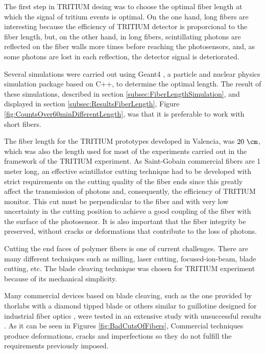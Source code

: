 The first step in TRITIUM desing was to choose the optimal fiber length at which the signal of tritium events is optimal. On the one hand, long fibers are interesting because the efficiency of TRITIUM detector is proporcional to the fiber length, but, on the other hand, in long fibers, scintillating photons are reflected on the fiber walls more times before reaching the photosensors, and, as some photons are lost in each reflection, the detector signal is deteriorated.

Several simulations were carried out using Geant4 \cite{Geant4WebPage}, a particle and nuclear physics simulation package based on C++, to determine the optimal length. The result of these simulations, described in section \ref{subsec:FiberLengthSimulation}, and displayed in section \ref{subsec:ResultsFiberLength}, Figure \ref{fig:CountsOver60minDifferentLength}, was that it is preferable to work with short fibers.

The fiber length for the TRITIUM prototypes developed in Valencia, was $20~\cm$, which was also the length used for most of the experiments carried out in the framework of the TRITIUM experiment. As Saint-Gobain commercial fibers are 1 meter long, an effective scintillator cutting technique had to be developed with strict requirements on the cutting quality of the fiber ends since this greatly affect the transmission of photons and, consequently, the efficiency of TRITIUM monitor. This cut must be perpendicular to the fiber and with very low uncertainty in the cutting position to achieve a good coupling of the fiber with the surface of the photosensor. It is also important that the fiber integrity be preserved, without cracks or deformations that contribute to the loss of photons.

Cutting the end faces of polymer fibers is one of current challenges. There are many different techniques such as milling, laser cutting, focused-ion-beam, blade cutting, etc. The blade cleaving technique was chosen for TRITIUM experiment because of its mechanical simplicity. %

Many commercial devices based on blade cleaving, such as the one provided by thorlabs with a diamond tipped blade \cite{DiamondThorlabs} or others similar to guillotine designed for industrial fiber optics \cite{GuillotineIFO}, were tested in an extensive study with unsuccessful results \cite{TFGAlberto}. As it can be seen in Figures \ref{fig:BadCutsOfFibers}, Commercial techniques produce deformations, cracks and imperfections so they do not fulfill the requirements previously imposed.

